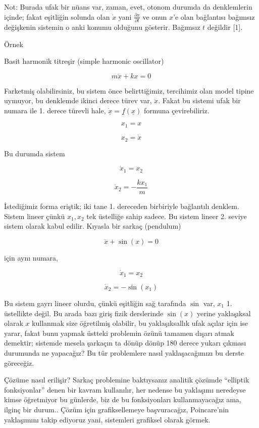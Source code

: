 \documentclass[12pt,fleqn]{article}\usepackage{../../common}
\begin{document}
Not: Burada ufak bir nüans var, zaman, evet, otonom durumda da denklemlerin
içinde; fakat eşitliğin solunda olan $\dot{x}$ yani $\frac{\partial x}{\partial
  t}$ ve onun $x$'e olan bağlantısı bağımsız değişkenin sistemin o anki konumu
olduğunu gösterir.  Bağımsız $t$ değildir [1].

Örnek

Basit harmonik titreşir (simple harmonic oscillator)

$$ m\ddot{x} + kx = 0 $$

Farketmiş olabilirsiniz, bu sistem önce belirttiğimiz, tercihimiz olan
model tipine uymuyor, bu denklemde ikinci derece türev var,
$\ddot{x}$. Fakat bu sistemi ufak bir numara ile 1. derece türevli hale,
$\dot{\underline{x}} = \underline{f}(\underline{x})$ formuna çevirebiliriz. 

$$ x_1 = x $$

$$ x_2 = \dot{x} $$

Bu durumda sistem

$$ \dot{x}_1 = x_2 $$

$$ \dot{x}_2 = -\frac{kx_1}{m} $$

İstediğimiz forma eriştik; iki tane 1. dereceden birbiriyle bağlantılı
denklem. Sistem lineer çünkü $x_1,x_2$ tek üstelliğe sahip sadece. Bu
sistem lineer 2. seviye sistem olarak kabul edilir. Kıyasla bir sarkaç
(pendulum) 

$$ \ddot{x} + \sin(x) = 0 $$

için aynı numara, 

$$ \dot{x}_1 = x_2 $$

$$ \dot{x}_2 = -\sin(x_1) $$

Bu sistem gayrı lineer olurdu, çünkü eşitliğin sağ tarafında $\sin$ var, $x_1$
1. üstellikte değil. Bu arada bazı giriş fizik derslerinde $\sin(x)$ yerine
yaklaşıksal olarak $x$ kullanmak size öğretilmiş olabilir, bu yaklaşıksallık
ufak açılar için ise yarar, fakat bunu yapmak üstteki problemin özünü tamamen
dışarı atmak demektir; sistemde mesela şarkaçın ta dönüp dönüp 180 derece yukarı
çıkması durumunda ne yapacağız? Bu tür problemlere nasıl yaklaşacağımızı bu
derste göreceğiz.

Çözüme nasıl erilişir? Sarkaç problemine baktıysanız analitik çözümde
``elliptik fonksiyonlar'' denen bir kavram kullanılır, her nedense bu
yaklaşımı neredeyse kimse öğretmiyor bu günlerde, biz de bu fonksiyonları
kullanmayacağız ama, ilginç bir durum.. Çözüm için grafiksellemeye
başvuracağız, Poincare'nin yaklaşımını takip ediyoruz yani, sistemleri
grafiksel olarak görmek.
\end{document}
